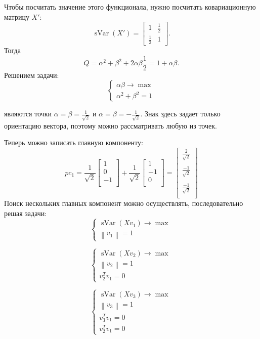 \documentclass[12pt]{article} %
\theoremstyle{definition} %
\DeclareMathOperator{\sVar}{sVar}
\begin{document}
Чтобы посчитать значение этого функционала, нужно посчитать ковариационную матрицу \(X'\):
\[
\sVar(X')=
\begin{bmatrix}
1&\frac{1}{2}\\
\frac{1}{2}&1
\end{bmatrix}.
\]
Тогда
\[Q = \alpha^2 + \beta^2 + 2\alpha \beta \frac{1}{2} = 1+\alpha \beta.\]
Решением задачи:
\[
\begin{cases}
\alpha \beta \to \max \\
\alpha^2 + \beta^2 = 1
\end{cases}
\]

являются точки \(\alpha=\beta=\frac{1}{\sqrt{2}}\) и \(\alpha=\beta=-\frac{1}{\sqrt{2}}\). Знак здесь задает только ориентацию вектора, поэтому можно рассматривать любую из точек.

Теперь можно записать главную компоненту:
\[pc_1 =
\frac{1}{\sqrt{2}} \begin{bmatrix}
1\\
0\\
-1\\
\end{bmatrix}
+
\frac{1}{\sqrt{2}} \begin{bmatrix}
1\\
-1\\
0\\
\end{bmatrix}
=
\begin{bmatrix}
\frac{2}{\sqrt{2}}\\~\\
\frac{-1}{\sqrt{2}}\\~\\
\frac{-1}{\sqrt{2}}\\
\end{bmatrix}
\]
Поиск нескольких главных компонент можно осуществлять, последовательно решая задачи:
\[
\begin{cases}
\sVar(Xv_1) \to \max \\
\left\| v_1 \right\| = 1
\end{cases}
\]

\[
\begin{cases}
\sVar(Xv_2) \to \max \\
\left\| v_2 \right\| = 1 \\
v_2^Tv_1 = 0
\end{cases}
\]

\[
\begin{cases}
\sVar(Xv_3) \to \max \\
\left\| v_3 \right\| = 1 \\
v_3^Tv_1 = 0\\
v_2^Tv_1 = 0
\end{cases}
\]
\end{document}
